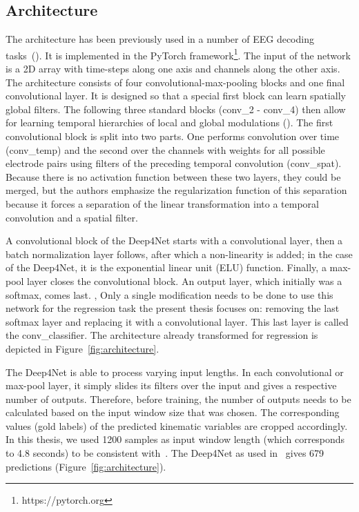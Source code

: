 \subsection{Architecture}\label{subsec:architecture}
The architecture has been previously used in a number of EEG decoding tasks~(\cite{Hammer-2021, schirrmeister-deep-2017, hartmann-hierarchical-2018}).
It is implemented in the PyTorch framework\footnote{https://pytorch.org}.
The input of the network is a 2D array with time-steps along one axis and channels along the other axis.
The architecture consists of four convolutional-max-pooling blocks and one final convolutional layer.
It is designed so that a special first block can learn spatially global filters.
The following three standard blocks (conv\_2 - conv\_4) then allow for learning temporal hierarchies of local and global modulations (\cite{schirrmeister-deep-2017}).
The first convolutional block is split into two parts.
One performs convolution over time (conv\_temp) and the second over the channels with weights for all possible electrode pairs using filters of the preceding temporal convolution (conv\_spat).
Because there is no activation function between these two layers, they could be merged, but the authors emphasize the regularization function of this separation because it forces a separation of the linear transformation into a temporal convolution and a spatial filter.

A convolutional block of the Deep4Net starts with a convolutional layer, then a batch normalization layer follows, after which a non-linearity is added; in the case of the Deep4Net, it is the exponential linear unit (ELU) function.
Finally, a max-pool layer closes the convolutional block.
An output layer, which initially was a softmax, comes last.
, Only a single modification needs to be done to use this network for the regression task the present thesis focuses on: removing the last softmax layer and replacing it with a convolutional layer.
This last layer is called the conv\_classifier.
The architecture already transformed for regression is depicted in Figure~\ref{fig:architecture}.

The Deep4Net is able to process varying input lengths. In each convolutional or max-pool layer, it simply slides its filters over the input and gives a respective number of outputs.
Therefore, before training, the number of outputs needs to be calculated based on the input window size that was chosen.
The corresponding values (gold labels) of the predicted kinematic variables are cropped accordingly.
In this thesis, we used 1200 samples as input window length (which corresponds to 4.8 seconds) to be consistent with~\cite{Hammer-2021}. The Deep4Net as used in~\cite{Hammer-2021} gives 679 predictions (Figure~\ref{fig:architecture}).

